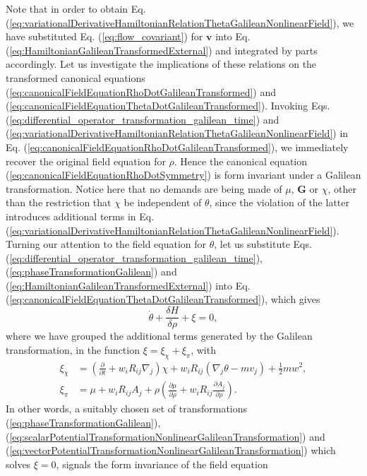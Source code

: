 \documentclass[twocolumn, nofootinbib, nobibnotes, amsmath,amssymb,aps, pra, floatfix]{revtex4-1}
\renewcommand{\v}[1]{\ensuremath{\mathbf{#1}}} %
\newcommand{\pd}[2]{\frac{\partial #1}{\partial #2}} %
\begin{document}
Note that in order to obtain Eq. (\ref{eq:variationalDerivativeHamiltonianRelationThetaGalileanNonlinearField}), we have substituted Eq. (\ref{eq:flow_covariant}) for $\v{v}$ into Eq. (\ref{eq:HamiltonianGalileanTransformedExternal}) and integrated by parts accordingly. 
Let us investigate the implications of these relations on the transformed canonical equations (\ref{eq:canonicalFieldEquationRhoDotGalileanTransformed}) and (\ref{eq:canonicalFieldEquationThetaDotGalileanTransformed}).
Invoking Eqs. (\ref{eq:differential_operator_transformation_galilean_time}) and (\ref{eq:variationalDerivativeHamiltonianRelationThetaGalileanNonlinearField}) in Eq. (\ref{eq:canonicalFieldEquationRhoDotGalileanTransformed}), we immediately recover the original field equation for $\rho$.
Hence the canonical equation (\ref{eq:canonicalFieldEquationRhoDotSymmetry}) is form invariant under a Galilean transformation.
Notice here that no demands are being made of $\mu$, $\v{G}$ or $\chi$, other than the restriction that $\chi$ be independent of $\theta$, since the violation of the latter introduces additional terms in Eq. (\ref{eq:variationalDerivativeHamiltonianRelationThetaGalileanNonlinearField}).
Turning our attention to the field equation for $\theta$, let us substitute Eqs. (\ref{eq:differential_operator_transformation_galilean_time}), (\ref{eq:phaseTransformationGalilean}) and (\ref{eq:HamiltonianGalileanTransformedExternal}) into Eq. (\ref{eq:canonicalFieldEquationThetaDotGalileanTransformed}), which gives
\begin{equation}
  \dot{\theta}+\frac{\delta H}{\delta\rho}+\xi=0,
  \label{eq:QHJE_elementary_fluid_galilean_transformed_generic_form}
\end{equation}
where we have grouped the additional terms generated by the Galilean transformation, in the function $\xi=\xi_{\chi}+\xi_{\pi}$, with
\begin{align}
    \xi_{\chi}&= \left(\pd{}{t}+w_iR_{ij}\nabla_j\right)\chi+w_iR_{ij}\left( \nabla_j\theta-mv_j \right)+\frac{1}{2}mw^2,\label{eq:xi_phase_factor}\\
    \xi_{\pi}&=\mu+w_iR_{ij}A_j+\rho\left( \pd{\mu}{\rho}+w_iR_{ij}\pd{A_j}{\rho} \right) \label{eq:xi_potentials}.
\end{align}
In other words, a suitably chosen set of transformations (\ref{eq:phaseTransformationGalilean}), (\ref{eq:scalarPotentialTransformationNonlinearGalileanTransformation}) and (\ref{eq:vectorPotentialTransformationNonlinearGalileanTransformation}) which solves $\xi=0$, signals the form invariance of the field equation
\end{document}
